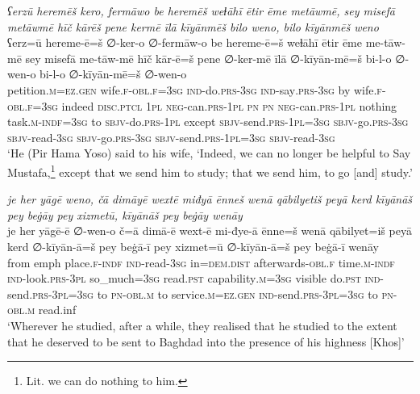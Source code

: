 \ea \label{ŽP.72}
\textit{ʕerzū heremēš kero, fermāwo be heremēš weɫāhī ētir ēme metāwmē, sey misefā metāwmē hīč kārēš pene kermē īlā kīyānmēš bilo weno, bilo kīyānmēš weno} \\ 
\gll ʕerz=ū hereme-ē=š ∅-ker-o ∅-fermāw-o be hereme-ē=š weɫāhī ētir ēme me-tāw-mē sey misefā me-tāw-mē hīč kār-ē=š pene ∅-ker-mē īlā ∅-kīyān-mē=š bi-l-o ∅-wen-o bi-l-o ∅-kīyān-mē=š ∅-wen-o \\ 
 petition\textsc{.m}\textsc{\textsc{=ez.gen}} wife\textsc{.f}\textsc{-obl}\textsc{.f}\textsc{=3sg} \textsc{ind-}do\textsc{.prs}\textsc{-3sg} \textsc{ind-}say\textsc{.prs}\textsc{-3sg} by wife\textsc{.f}\textsc{-obl}\textsc{.f}\textsc{=3sg} indeed \textsc{disc.ptcl} \textsc{1pl} \textsc{neg-}can\textsc{.prs}\textsc{-1pl} \textsc{pn} \textsc{pn} \textsc{neg-}can\textsc{.prs}\textsc{-1pl} nothing task\textsc{.m}\textsc{-indf}\textsc{=3sg} to \textsc{sbjv-}do\textsc{.prs}\textsc{-1pl} except \textsc{sbjv-}send\textsc{.prs}\textsc{-1pl}\textsc{=3sg} \textsc{sbjv-}go\textsc{.prs}\textsc{-3sg} \textsc{sbjv-}read\textsc{-3sg} \textsc{sbjv-}go\textsc{.prs}\textsc{-3sg} \textsc{sbjv-}send\textsc{.prs}\textsc{-1pl}\textsc{=3sg} \textsc{sbjv-}read\textsc{-3sg} \\ 
\glt `He (Pir Hama Yoso) said to his wife, ‘Indeed, we can no longer be helpful to Say Mustafa,\footnote{Lit. we can do nothing to him.} except that we send him to study; that we send him, to go [and] study.'
\z 
 
\ea \label{ŽP.80}
\textit{je her yāgē weno, čā dimāyē wextē miđyā ēnneš wenā qābilyetiš peyā kerd kīyānāš pey beġāy pey xizmetū, kīyānāš pey beġāy wenāy} \\ 
\gll je her yāgē-ē ∅-wen-o č=ā dimā-ē wext-ē mi-đye-ā ēnne=š wenā qābilyet=iš peyā kerd ∅-kīyān-ā=š pey beġā-ī pey xizmet=ū ∅-kīyān-ā=š pey beġā-ī wenāy \\ 
 from emph place\textsc{.f}\textsc{-indf} \textsc{ind-}read\textsc{-3sg} in=\textsc{dem.dist} afterwards\textsc{-obl}\textsc{.f} time\textsc{.m}\textsc{-indf} \textsc{ind-}look\textsc{.prs}\textsc{-3pl} so\_much\textsc{=3sg} read\textsc{.pst} capability\textsc{.m}\textsc{=3sg} visible do\textsc{.pst} \textsc{ind-}send\textsc{.prs}\textsc{-3pl}\textsc{=3sg} to \textsc{pn}\textsc{-obl}\textsc{.m} to service\textsc{.m}\textsc{\textsc{=ez.gen}} \textsc{ind-}send\textsc{.prs}\textsc{-3pl}\textsc{=3sg} to \textsc{pn}\textsc{-obl}\textsc{.m} read.inf \\ 
\glt `Wherever he studied, after a while, they realised that he studied to the extent that he deserved to be sent to Baghdad into the presence of his highness [Khos]'
\z 
 

